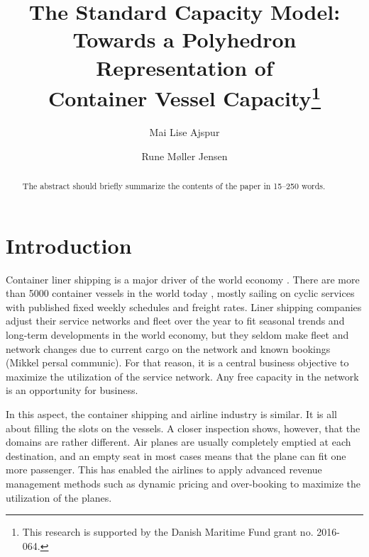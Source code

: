 \documentclass[runningheads]{llncs}
\begin{document}
%
\title{The Standard Capacity Model: \\Towards a Polyhedron Representation of\\ Container Vessel Capacity\thanks{This research is supported by the Danish Maritime Fund grant no. 2016-064.}}
%
%
\author{Mai Lise Ajspur \and
Rune M{\o}ller Jensen}
%

%
%
\maketitle              %
%
\begin{abstract}
The abstract should briefly summarize the contents of the paper in
15--250 words.

\end{abstract}

\section{Introduction}
Container liner shipping is a major driver of the world economy \cite{TE13}. There are more than 5000 container vessels in the world today \cite{RMT16}, mostly sailing on cyclic services with published fixed weekly schedules and freight rates. Liner shipping companies adjust their service networks and fleet over the year to fit seasonal trends and long-term developments in the world economy, but they seldom make fleet and network changes due to current cargo on the network and known bookings (Mikkel persal communic). For that reason, it is a central business objective to maximize the utilization of the service network. Any free capacity in the network is an opportunity for business.

In this aspect, the container shipping and airline industry is similar. It is all about filling the slots on the vessels. A closer inspection shows, however, that the domains are rather different. Air planes are usually completely emptied at each destination, and an empty seat in most cases means that the plane can fit one more passenger. This has enabled the airlines to apply advanced revenue management methods such as dynamic pricing and over-booking to maximize the utilization of the planes.
\end{document}
